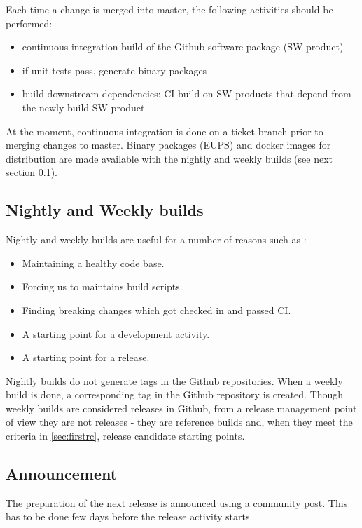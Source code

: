 Each time a change is merged into master, the following activities should be performed:

\begin{itemize}
\item continuous integration build of the Github software package (SW product)
\item if unit tests pass, generate binary packages
\item build downstream dependencies: CI build on SW products that depend from the newly build SW product.
\end{itemize}

At the moment, continuous integration is done on a ticket branch prior to merging changes to master. Binary packages (EUPS) and docker images for distribution are made available with the nightly and weekly builds (see next section \ref{sec:weekly}).


\subsection{Nightly and Weekly builds} \label{sec:weekly}

Nightly and weekly builds are  useful for a number of reasons such as :
\begin{itemize}
	\item Maintaining a healthy code base.
	\item Forcing us to maintains build scripts.
	\item Finding breaking changes which got checked in and passed CI.
	\item A starting point for a development activity.
	\item A starting point for a release.
\end{itemize}

Nightly builds do not generate tags in the Github repositories.
When a weekly build is done, a corresponding tag in the Github repository is created.
Though weekly builds are considered releases in Github, from a release management point of view they are not
releases - they are reference builds and, when they meet the criteria in \ref{sec:firstrc}, release candidate starting points.


\subsection{Announcement} \label{sec:anaouncement}

The preparation of the next release is announced using a community post.
This has to be done few days before the release activity starts.

